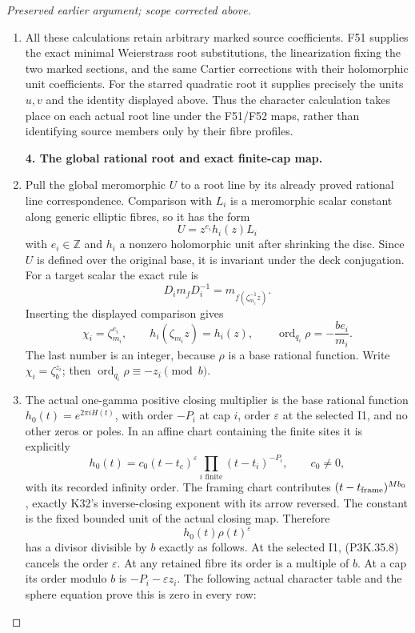 \begin{proof}[Preserved earlier argument; scope corrected above]
\begin{enumerate}[label=\arabic*.]
\item All these calculations retain arbitrary marked source coefficients.
F51 supplies the exact minimal Weierstrass root substitutions,
the linearization fixing the two marked sections, and the same
Cartier corrections with their holomorphic unit coefficients.
For the starred quadratic root it supplies precisely the units
\(u,v\) and the identity displayed above. Thus the character
calculation takes place on each actual root line under the F51/F52
maps, rather than identifying source members only by their fibre
profiles.

\par\medskip\noindent\textbf{4. The global rational root and exact finite-cap map.}\enspace

\item Pull the global meromorphic \(U\) to a root line by its already
proved rational line correspondence. Comparison with \(L_i\)
is a meromorphic scalar constant along generic elliptic fibres,
so it has the form
\[
                          U=z^{e_i}h_i(z)L_i
\]
with \(e_i\in\mathbb Z\) and \(h_i\) a nonzero holomorphic
unit after shrinking the disc. Since \(U\) is defined over
the original base, it is invariant under the deck conjugation.
For a target scalar the exact rule is
\[
 D_i m_f D_i^{-1}=m_{f(\zeta_{m_i}^{-1}z)}.
\]
Inserting the displayed comparison gives
\[
 \chi_i=\zeta_{m_i}^{e_i},\qquad
 h_i(\zeta_{m_i}z)=h_i(z),\qquad
 \operatorname{ord}_{q_i}\rho=-\frac{be_i}{m_i}.        \tag{P3K.35.13}
\]
The last number is an integer, because \(\rho\) is a base
rational function. Write \(\chi_i=\zeta_b^{z_i}\); then
\(\operatorname{ord}_{q_i}\rho\equiv-z_i\pmod b\).

\item The actual one-gamma positive closing multiplier is the base
rational function \(h_0(t)=e^{2\pi iH(t)}\), with order
\(-P_i\) at cap \(i\), order \(\varepsilon\) at the
selected I1, and no other zeros or poles.
In an affine chart containing the finite sites it is explicitly
\[
 h_0(t)=c_0(t-t_c)^\varepsilon
                   \prod_{i\text{ finite}}(t-t_i)^{-P_i},
 \qquad c_0\ne0,
\]
with its recorded infinity order. The framing chart contributes
\((t-t_{\rm frame})^{Mb_0}\), exactly K32's inverse-closing
exponent with its arrow reversed. The constant is the fixed
bounded unit of the actual closing map. Therefore
\[
                h_0(t)\rho(t)^\varepsilon
\]
has a divisor divisible by \(b\) exactly as follows. At the
selected I1, (P3K.35.8) cancels the order \(\varepsilon\).
At any retained fibre its order is a multiple of \(b\).
At a cap its order modulo \(b\) is
\(-P_i-\varepsilon z_i\). The following actual character
table and the sphere equation prove this is zero in every row:


\end{enumerate}
\end{proof}
